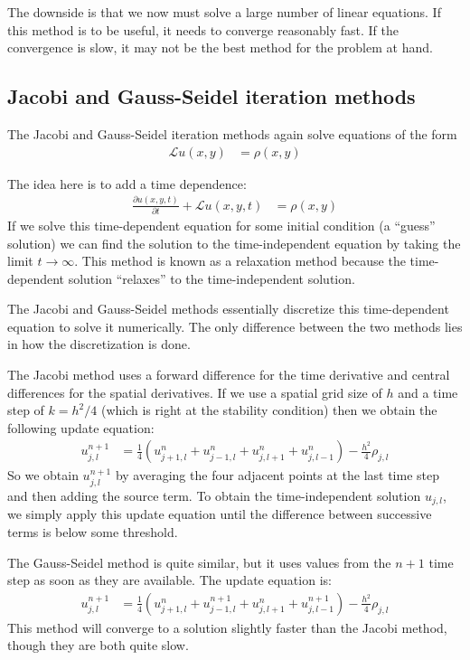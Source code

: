 \documentclass[twocolumn]{myarticle}
\begin{document}
The downside is that we now must solve a large number of linear equations.
If this method is to be useful, it needs to converge reasonably fast.
If the convergence is slow, it may not be the best method for the problem at hand.

\subsection{Jacobi and Gauss-Seidel iteration methods}
\label{subsec:jacobi_and_gauss_seidel_iteration_methods}

The Jacobi and Gauss-Seidel iteration methods again solve equations of the form
\begin{align}
    \mathcal{L} u(x, y) &= \rho(x, y)
\end{align}

The idea here is to add a time dependence:
\begin{align}
    \frac{\partial u(x, y, t)}{\partial t} + \mathcal{L} u(x, y, t) &= \rho(x, y)
\end{align}
If we solve this time-dependent equation for some initial condition (a ``guess'' solution) we can find the solution to the time-independent equation by taking the limit $ t \to \infty $.
This method is known as a relaxation method because the time-dependent solution ``relaxes'' to the time-independent solution.

The Jacobi and Gauss-Seidel methods essentially discretize this time-dependent equation to solve it numerically.
The only difference between the two methods lies in how the discretization is done.

The Jacobi method uses a forward difference for the time derivative and central differences for the spatial derivatives. If we use a spatial grid size of $ h $ and a time step of $ k = h^2/4 $ (which is right at the stability condition) then we obtain the following update equation:
\begin{align}
    u^{n+1}_{j, l} &= \frac{1}{4} \left( u^{n}_{j+1, l} + u^{n}_{j-1, l} + u^{n}_{j, l+1} + u^{n}_{j, l-1} \right) - \frac{h^2}{4} \rho_{j,l}
\end{align}
So we obtain $ u^{n+1}_{j, l} $ by averaging the four adjacent points at the last time step and then adding the source term.
To obtain the time-independent solution $ u_{j, l} $, we simply apply this update equation until the difference between successive terms is below some threshold.

The Gauss-Seidel method is quite similar, but it uses values from the $ n+1 $ time step as soon as they are available.
The update equation is:
\begin{align}
    u^{n+1}_{j, l} &= \frac{1}{4} \left( u^{n}_{j+1, l} + u^{n+1}_{j-1, l} + u^{n}_{j, l+1} + u^{n+1}_{j, l-1} \right) - \frac{h^2}{4} \rho_{j,l}
\end{align}
This method will converge to a solution slightly faster than the Jacobi method, though they are both quite slow.
\end{document}

